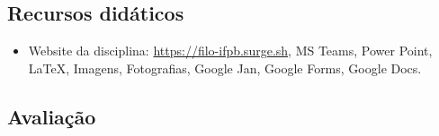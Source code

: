\documentclass[
	article,			%
	12pt,				%
	twoside,			%
	a4paper,			%
	english,			%
	brazil,				%
	sumario=tradicional
]{plano}
\begin{document}





\begin{snugshade}
	\section{Recursos didáticos} %
\end{snugshade}

\begin{itemize}

	\item Website da disciplina: \href{https://filo-ifpb.surge.sh}{https://filo-ifpb.surge.sh},  MS Teams, Power Point, \LaTeX, Imagens, Fotografias, Google Jan, Google Forms, Google Docs.

\end{itemize}

\begin{snugshade}
	\section{Avaliação} %
\end{snugshade}

\end{document}
